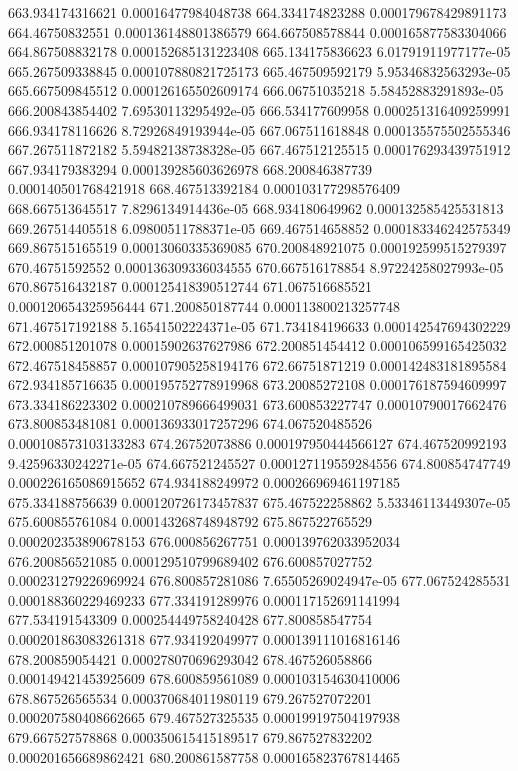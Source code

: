 {663.934174316621 0.00016477984048738
664.334174823288 0.000179678429891173
664.46750832551 0.000136148801386579
664.667508578844 0.000165877583304066
664.867508832178 0.000152685131223408
665.134175836623 6.01791911977177e-05
665.267509338845 0.000107880821725173
665.467509592179 5.95346832563293e-05
665.667509845512 0.000126165502609174
666.06751035218 5.58452883291893e-05
666.200843854402 7.69530113295492e-05
666.534177609958 0.000251316409259991
666.934178116626 8.72926849193944e-05
667.067511618848 0.000135575502555346
667.267511872182 5.59482138738328e-05
667.467512125515 0.000176293439751912
667.934179383294 0.000139285603626978
668.200846387739 0.000140501768421918
668.467513392184 0.000103177298576409
668.667513645517 7.8296134914436e-05
668.934180649962 0.000132585425531813
669.267514405518 6.09800511788371e-05
669.467514658852 0.000183346242575349
669.867515165519 0.00013060335369085
670.200848921075 0.000192599515279397
670.46751592552 0.000136309336034555
670.667516178854 8.97224258027993e-05
670.867516432187 0.000125418390512744
671.067516685521 0.000120654325956444
671.200850187744 0.000113800213257748
671.467517192188 5.16541502224371e-05
671.734184196633 0.000142547694302229
672.000851201078 0.00015902637627986
672.200851454412 0.000106599165425032
672.467518458857 0.000107905258194176
672.66751871219 0.000142483181895584
672.934185716635 0.000195752778919968
673.20085272108 0.000176187594609997
673.334186223302 0.000210789666499031
673.600853227747 0.00010790017662476
673.800853481081 0.000136933017257296
674.067520485526 0.000108573103133283
674.26752073886 0.000197950444566127
674.467520992193 9.42596330242271e-05
674.667521245527 0.000127119559284556
674.800854747749 0.000226165086915652
674.934188249972 0.000266969461197185
675.334188756639 0.000120726173457837
675.467522258862 5.53346113449307e-05
675.600855761084 0.000143268748948792
675.867522765529 0.000202353890678153
676.000856267751 0.000139762033952034
676.200856521085 0.000129510799689402
676.600857027752 0.000231279226969924
676.800857281086 7.65505269024947e-05
677.067524285531 0.000188360229469233
677.334191289976 0.000117152691141994
677.534191543309 0.000254449758240428
677.800858547754 0.000201863083261318
677.934192049977 0.000139111016816146
678.200859054421 0.000278070696293042
678.467526058866 0.000149421453925609
678.600859561089 0.000103154630410006
678.867526565534 0.000370684011980119
679.267527072201 0.000207580408662665
679.467527325535 0.000199197504197938
679.667527578868 0.000350615415189517
679.867527832202 0.000201656689862421
680.200861587758 0.000165823767814465
}
